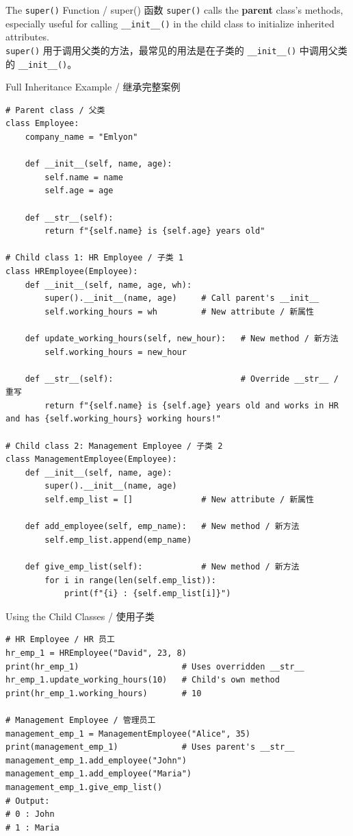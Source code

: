 \documentclass[11pt,a4paper]{report}
\let\oldtexttt\texttt
\renewcommand{\texttt}[1]{\textcolor{mainblue}{\oldtexttt{#1}}}
\begin{document}
\begin{concept}{The \texttt{super()} Function / super() 函数}
    \texttt{super()} calls the \textbf{parent} class's methods, especially useful for calling \texttt{\_\_init\_\_()} in the child class to initialize inherited attributes. \\
    \texttt{super()} 用于调用父类的方法，最常见的用法是在子类的 \texttt{\_\_init\_\_()} 中调用父类的 \texttt{\_\_init\_\_()}。
\end{concept}

\begin{examplebox}{Full Inheritance Example / 继承完整案例}
\begin{lstlisting}
# Parent class / 父类
class Employee:
    company_name = "Emlyon"

    def __init__(self, name, age):
        self.name = name
        self.age = age

    def __str__(self):
        return f"{self.name} is {self.age} years old"

# Child class 1: HR Employee / 子类 1
class HREmployee(Employee):
    def __init__(self, name, age, wh):
        super().__init__(name, age)     # Call parent's __init__
        self.working_hours = wh         # New attribute / 新属性

    def update_working_hours(self, new_hour):   # New method / 新方法
        self.working_hours = new_hour

    def __str__(self):                          # Override __str__ / 重写
        return f"{self.name} is {self.age} years old and works in HR and has {self.working_hours} working hours!"

# Child class 2: Management Employee / 子类 2
class ManagementEmployee(Employee):
    def __init__(self, name, age):
        super().__init__(name, age)
        self.emp_list = []              # New attribute / 新属性

    def add_employee(self, emp_name):   # New method / 新方法
        self.emp_list.append(emp_name)

    def give_emp_list(self):            # New method / 新方法
        for i in range(len(self.emp_list)):
            print(f"{i} : {self.emp_list[i]}")
\end{lstlisting}
\end{examplebox}

\begin{examplebox}{Using the Child Classes / 使用子类}
\begin{lstlisting}
# HR Employee / HR 员工
hr_emp_1 = HREmployee("David", 23, 8)
print(hr_emp_1)                     # Uses overridden __str__
hr_emp_1.update_working_hours(10)   # Child's own method
print(hr_emp_1.working_hours)       # 10

# Management Employee / 管理员工
management_emp_1 = ManagementEmployee("Alice", 35)
print(management_emp_1)             # Uses parent's __str__
management_emp_1.add_employee("John")
management_emp_1.add_employee("Maria")
management_emp_1.give_emp_list()
# Output:
# 0 : John
# 1 : Maria
\end{lstlisting}
\end{examplebox}
\end{document}
